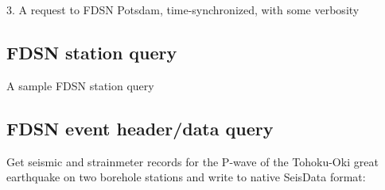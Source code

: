 \documentclass[letterpaper,11pt,english]{sphinxmanual}
\begin{document}
3. A request to FDSN Potsdam, time-synchronized, with some verbosity

\begin{sphinxVerbatim}[commandchars=\\\{\}]
  
  
        
\end{sphinxVerbatim}


\subsection{FDSN station query}
\label{\detokenize{src/Appendices/examples:fdsn-station-query}}
A sample FDSN station query

\begin{sphinxVerbatim}[commandchars=\\\{\}]
  
\end{sphinxVerbatim}


\subsection{FDSN event header/data query}
\label{\detokenize{src/Appendices/examples:fdsn-event-header-data-query}}
Get seismic and strainmeter records for the P-wave of the Tohoku-Oki great earthquake on two borehole stations and write to native SeisData format:

\begin{sphinxVerbatim}[commandchars=\\\{\}]
   
 
\end{sphinxVerbatim}
\end{document}
